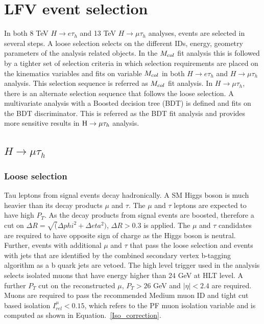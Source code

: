

\chapter{LFV event selection}
In both 8 TeV $H\rightarrow e\tau_h$ and 13 TeV $H\rightarrow\mu\tau_h$ analyses, events are selected in several steps. A loose selection selects on the different IDs, energy, geometry parameters of the analysis related objects. In the $M_{col}$ fit analysis this is followed by a tighter set of selection criteria in which selection requirements are placed on the kinematics variables and fits on variable $M_{col}$ in both  $H\rightarrow e\tau_h$ and $H\rightarrow\mu\tau_h$ analysis. This selection sequence is referred as $M_{col}$ fit analysis. In $H\rightarrow\mu\tau_h$, there is an alternate selection sequence that follows the loose selection. A multivariate analysis with a Boosted decision tree (BDT) is defined and fits on the BDT discriminator. This is referred as the BDT fit analysis and provides more sensitive results in $\mathrm{H}\to \mu\tau_{h}$ analysis. 



\section{\texorpdfstring{$H\rightarrow\mu\tau_h$}{Lg}}
\subsection{Loose selection}
Tau leptons from signal events decay hadronically. A SM Higgs boson is much heavier than its decay products $\mu$ and $\tau$. The $\mu$ and $\tau$ leptons are expected to have high $P_{T}$. As the decay products from signal events are boosted, therefore a cut on $\Delta R=\sqrt(\Delta phi^{2}+\Delta eta^{2})$, $\Delta R>0.3$ is applied. The $\mu$ and $\tau$ candidates are required to have opposite sign of charge as the Higgs boson is neutral. Further, events with additional $\mu$ and $\tau$ that pass the loose selection and events with jets that are identified by the combined secondary vertex b-tagging algorithm \cite{btag_ago} as a b quark jets are vetoed. The high level trigger used in the analysis selects isolated muons that have energy higher than 24 GeV at HLT level. A further $P_{T}$ cut on the reconstructed $\mu$,  $P_{T}>26$ GeV and $|\eta|<2.4$ are required. Muons are required to pass the recommended Medium muon ID and tight cut based isolation $I^{\mu}_{rel}<0.15$, which refers to the PF muon isolation variable and is computed as shown in Equation.~\ref{Iso_correction}. %

